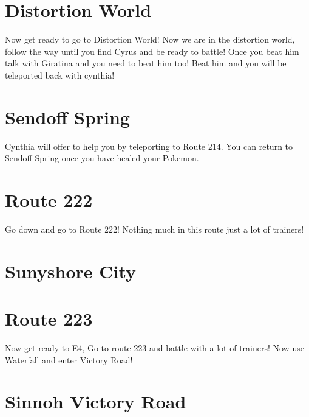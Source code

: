 \documentclass[11pt]{article}
\begin{document}
\section{Distortion World}\label{sec:distortion-world}
Now get ready to go to Distortion World!
Now we are in the distortion world, 
follow the way until you find Cyrus and be ready to battle!
Once you beat him talk with Giratina and you need to beat him too!
Beat him and you will be teleported back with cynthia!

\section{Sendoff Spring}\label{sec:sendoff-spring}
Cynthia will offer to help you by teleporting to Route 214.
You can return to Sendoff Spring once you have healed your Pokemon.





\section{Route 222}\label{sec:route-222}
Go down and go to Route 222!
Nothing much in this route just a lot of trainers!




\section{Sunyshore City}\label{sec:sunyshore-city}

\section{Route 223}\label{sec:route-223}
Now get ready to E4, Go to route 223 and battle with a lot of trainers!
Now use Waterfall and enter Victory Road!



\section{Sinnoh Victory Road}\label{sec:sinnoh-victory-road}
\end{document}
